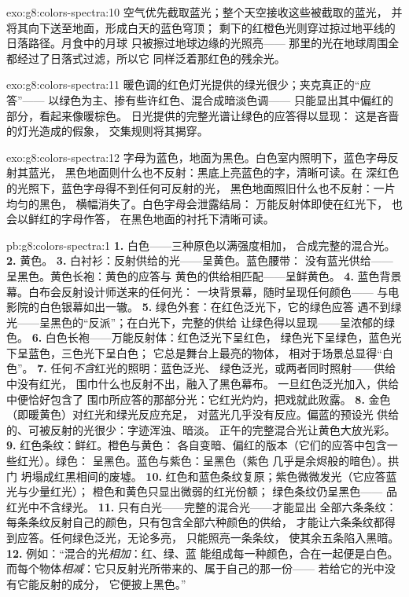 \begin{solution}{exo:g8:colors-spectra:10}
空气优先截取蓝光；整个天空接收这些被截取的蓝光，
并将其向下送至地面，形成白天的蓝色穹顶；
剩下的红橙色光则穿过掠过地平线的日落路径。月食中的月球
只被擦过地球边缘的光照亮——
那里的光在地球周围全都经过了日落式过滤，所以它
同样泛着那红色的残余光。
\end{solution}

\begin{solution}{exo:g8:colors-spectra:11}
暖色调的红色灯光提供的绿光很少；夹克真正的“应答”——
以绿色为主、掺有些许红色、混合成暗淡色调——
只能显出其中偏红的部分，看起来像暖棕色。
日光提供的完整光谱让绿色的应答得以显现：
这是吝啬的灯光造成的假象，
交集规则将其揭穿。
\end{solution}

\begin{solution}{exo:g8:colors-spectra:12}
字母为蓝色，地面为黑色。白色室内照明下，蓝色字母反射其蓝光，
黑色地面则什么也不反射：黑底上亮蓝色的字，清晰可读。在
深红色的光照下，蓝色字母得不到任何可反射的光，
黑色地面照旧什么也不反射：一片均匀的黑色，
横幅消失了。白色字母会泄露结局：
万能反射体即使在红光下，
也会以鲜红的字母作答，
在黑色地面的衬托下清晰可读。
\end{solution}

\begin{solution}{pb:g8:colors-spectra:1}
\textbf{1.} 白色——三种原色以满强度相加，
合成完整的混合光。
\textbf{2.} 黄色。
\textbf{3.} 白衬衫：反射供给的光——呈黄色。蓝色腰带：
没有蓝光供给——呈黑色。黄色长袍：黄色的应答与
黄色的供给相匹配——呈鲜黄色。
\textbf{4.} 蓝色背景幕。白布会反射设计师送来的任何光：
一块背景幕，随时呈现任何颜色——
与电影院的白色银幕如出一辙。
\textbf{5.} 绿色外套：在红色泛光下，它的绿色应答
遇不到绿光——呈黑色的“反派”；在白光下，完整的供给
让绿色得以显现——呈浓郁的绿色。
\textbf{6.} 白色长袍——万能反射体：红色泛光下呈红色，
绿色光下呈绿色，蓝色光下呈蓝色，三色光下呈白色；
它总是舞台上最亮的物体，
相对于场景总显得“白色”。
\textbf{7.} 任何\emph{不含}红光的照明：蓝色泛光、
绿色泛光，或两者同时照射——供给中没有红光，
围巾什么也反射不出，融入了黑色幕布。
一旦红色泛光加入，供给中便恰好包含了
围巾所应答的那部分光：它红光灼灼，把戏就此败露。
\textbf{8.} 金色（即暖黄色）对红光和绿光反应充足，
对蓝光几乎没有反应。偏蓝的预设光
供给的、可被反射的光很少：字迹浑浊、暗淡。
正午的完整混合光让黄色大放光彩。
\textbf{9.} 红色条纹：鲜红。橙色与黄色：
各自变暗、偏红的版本（它们的应答中包含一些红光）。绿色：
呈黑色。蓝色与紫色：呈黑色（紫色
几乎是余烬般的暗色）。拱门
坍塌成红黑相间的废墟。
\textbf{10.} 红色和蓝色条纹复原；紫色微微发光（它应答蓝光与少量红光）；
橙色和黄色只显出微弱的红光份额；
绿色条纹仍呈黑色——
品红光中不含绿光。
\textbf{11.} 只有白光——完整的混合光——才能显出
全部六条条纹：每条条纹反射自己的颜色，只有包含全部六种颜色的供给，
才能让六条条纹都得到应答。任何绿色泛光，无论多亮，
只能照亮一条条纹，
使其余五条陷入黑暗。
\textbf{12.} 例如：“混合的光\emph{相加}：红、绿、蓝
能组成每一种颜色，合在一起便是白色。
而每个物体\emph{相减}：它只反射光所带来的、属于自己的那一份——
若给它的光中没有它能反射的成分，
它便披上黑色。”
\end{solution}
